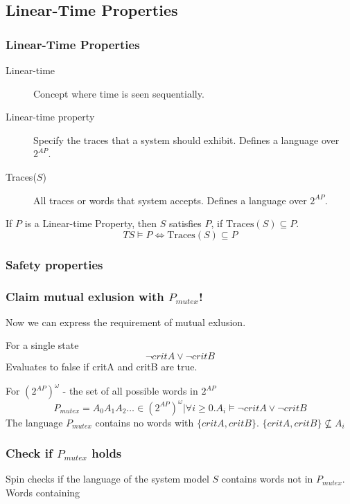 \documentclass{beamer}
\begin{document}
\subsection{Linear-Time Properties}

\begin{frame}
  \frametitle{Linear-Time Properties}
    \begin{description}
    \item[Linear-time] Concept where time is seen sequentially.
    \item[Linear-time property] Specify the traces that a system should exhibit. Defines a language over $2^{AP}$.
    \item[Traces($S$)] All traces or words that system accepts. Defines a language over $2^{AP}$.
    \end{description}
If $P$ is a Linear-time Property, then $S$ satisfies $P$, if $\text{Traces}(S) \subseteq P$. 
\[
TS \models P \iff \text{Traces}(S) \subseteq P 
\]

\end{frame}

\subsubsection{Safety properties}

\begin{frame}
  \frametitle{Claim mutual exlusion with $P_{mutex}$! }
  Now we can express the requirement of mutual exlusion.
  \begin{block}{For a single state}
\[
 \neg critA \lor \neg critB
\]
Evaluates to false if critA and critB are true.
  \end{block}
  \begin{block}{For $(2^{AP})^{\omega}$ - the set of all possible words in $2^{AP}$}
\[
P_{mutex}   = {A_0 A_1 A_2 \dots \in (2^{AP})^{\omega} | \forall i \geq 0.   A_i \models \neg critA \lor \neg critB}
\]
The language $P_{mutex}$ contains no words with $\{critA,critB\}$. $\{critA,critB\} \not \subseteq A_i$
  \end{block}
\end{frame}

\begin{frame}
  \frametitle{Check if $P_{mutex}$ holds}
  Spin checks if the language of the system model $S$ contains words not in $P_{mutex}$. Words containing  
\end{frame}
\end{document}
